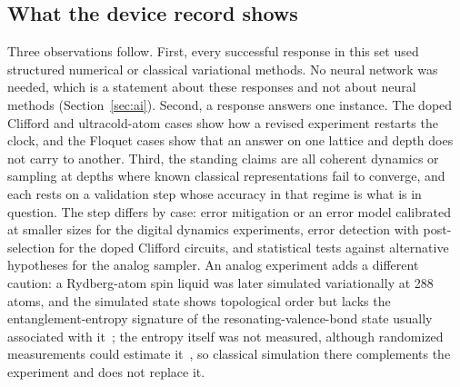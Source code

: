 \subsection{What the device record shows}
Three observations follow. First, every successful response in this set used structured numerical or classical variational methods. No neural network was needed, which is a statement about these responses and not about neural methods (Section~\ref{sec:ai}). Second, a response answers one instance. The doped Clifford and ultracold-atom cases show how a revised experiment restarts the clock, and the Floquet cases show that an answer on one lattice and depth does not carry to another. Third, the standing claims are all coherent dynamics or sampling at depths where known classical representations fail to converge, and each rests on a validation step whose accuracy in that regime is what is in question. The step differs by case: error mitigation or an error model calibrated at smaller sizes for the digital dynamics experiments, error detection with post-selection for the doped Clifford circuits, and statistical tests against alternative hypotheses for the analog sampler. An analog experiment adds a different caution: a Rydberg-atom spin liquid was later simulated variationally at 288 atoms, and the simulated state shows topological order but lacks the entanglement-entropy signature of the resonating-valence-bond state usually associated with it~\cite{semeghini2021,mauron2025tee}; the entropy itself was not measured, although randomized measurements could estimate it~\cite{brydges2019}, so classical simulation there complements the experiment and does not replace it.
